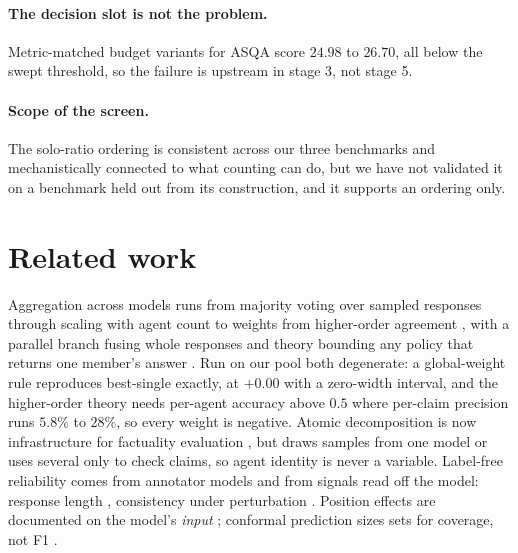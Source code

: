 \documentclass{article}
\begin{document}
\paragraph{The decision slot is not the problem.}
Metric-matched budget variants for ASQA score $24.98$ to $26.70$, all below the swept threshold, so the failure is upstream in stage 3, not stage 5. %

\paragraph{Scope of the screen.}
The solo-ratio ordering is consistent across our three benchmarks and mechanistically connected to what counting can do, but we have not validated it on a benchmark held out from its construction, and it supports an ordering only.

\section{Related work}
\label{sec:related}

Aggregation across models runs from majority voting over sampled responses \cite{wang2022self} through scaling with agent count \cite{li2024agents} to weights from higher-order agreement \cite{ai2025majority}, with a parallel branch fusing whole responses \cite{jiang2023llm,chen2023universal} and theory bounding any policy that returns one member's answer \cite{ananthakrishnan2026power}. Run on our pool both degenerate: a global-weight rule reproduces best-single exactly, at $+0.00$ with a zero-width interval, %
and the higher-order theory needs per-agent accuracy above $0.5$ where per-claim precision runs $5.8\%$ to $28\%$, so every weight is negative. %
Atomic decomposition is now infrastructure for factuality evaluation \cite{thirukovalluru2024atomic,zhang2024atomic,ning2025mad,wan2025fastfact,liu2025verifact,goel2025zero,panou2025harnessing}, but draws samples from one model or uses several only to check claims, so agent identity is never a variable. Label-free reliability comes from annotator models \cite{dawid1979maximum,sinha2018fast,majdi2023crowd,kuzin2025improving} and from signals read off the model: response length \cite{janiak2025illusion,zhang2024verbosity}, consistency under perturbation \cite{wu2026this,ahn2025prompt}. Position effects are documented on the model's \emph{input} \cite{guo2024serial,zhang2026position,salvatore2025lost,qiao2026llm,yan2026evirank}; conformal prediction sizes sets for coverage, not F1 \cite{gauthier2025adaptive}.
\end{document}
